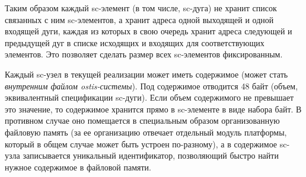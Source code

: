 \begin{SCn}
{Таким образом каждый sc-элемент (в том числе, sc-дуга) не хранит список связанных с ним sc-элементов, а хранит адреса одной выходящей и одной входящей дуги, каждая из которых в свою очередь хранит адреса следующей и предыдущей дуг в списке исходящих и входящих для соответствующих элементов. Это позволяет сделать размер всех sc-элементов фиксированным.
	
Каждый sc-узел в текущей реализации может иметь содержимое (может стать \textit{внутренним файлом ostis-системы}). Под содержимое отводится 48 байт (объем, эквивалентный спецификации sc-дуги). Если объем содержимого не превышает это значение, то содержимое хранится прямо в sc-элементе в виде набора байт. В противном случае оно помещается в специальным образом организованную файловую память (за ее организацию отвечает отдельный модуль платформы, который в общем случае может быть устроен по-разному), а в содержимое sc-узла записывается уникальный идентификатор, позволяющий быстро найти нужное содержимое в файловой памяти.
}


\scnendstruct

\end{SCn}